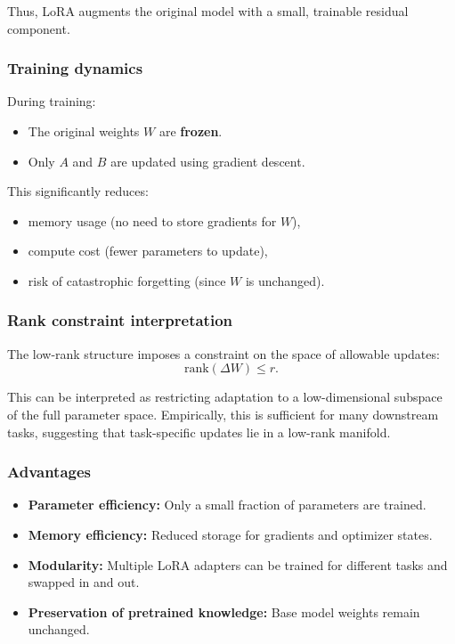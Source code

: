 \documentclass{article}
\begin{document}
Thus, LoRA augments the original model with a small, trainable residual component.

\subsubsection{Training dynamics}

During training:
\begin{itemize}
    \item The original weights $W$ are \textbf{frozen}.
    \item Only $A$ and $B$ are updated using gradient descent.
\end{itemize}

This significantly reduces:
\begin{itemize}
    \item memory usage (no need to store gradients for $W$),
    \item compute cost (fewer parameters to update),
    \item risk of catastrophic forgetting (since $W$ is unchanged).
\end{itemize}

\subsubsection{Rank constraint interpretation}

The low-rank structure imposes a constraint on the space of allowable updates:
\[
\mathrm{rank}(\Delta W) \le r.
\]

This can be interpreted as restricting adaptation to a low-dimensional subspace of the full parameter space. Empirically, this is sufficient for many downstream tasks, suggesting that task-specific updates lie in a low-rank manifold.

\subsubsection{Advantages}

\begin{itemize}
    \item \textbf{Parameter efficiency:} Only a small fraction of parameters are trained.
    \item \textbf{Memory efficiency:} Reduced storage for gradients and optimizer states.
    \item \textbf{Modularity:} Multiple LoRA adapters can be trained for different tasks and swapped in and out.
    \item \textbf{Preservation of pretrained knowledge:} Base model weights remain unchanged.
\end{itemize}
\end{document}
